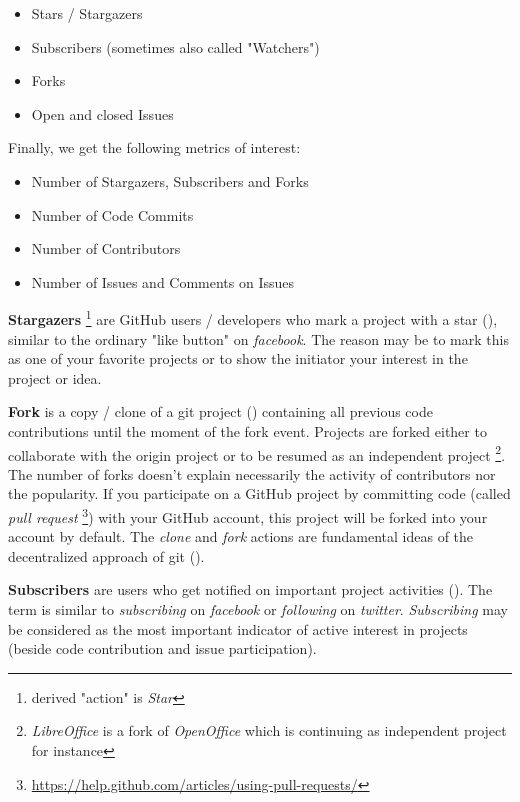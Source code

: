 \begin{itemize}
	\item Stars / Stargazers
	\item Subscribers (sometimes also called "Watchers")
	\item Forks
	\item Open and closed Issues
\end{itemize}

Finally, we get the following metrics of interest:

\begin{itemize}
	\item Number of Stargazers, Subscribers and Forks
	\item Number of Code Commits
	\item Number of Contributors
	\item Number of Issues and Comments on Issues
\end{itemize}

\textbf{Stargazers} \footnote{derived "action" is \textit{Star}} are GitHub users / developers who mark a project with a star (\cite{GitHubStargazers}), similar to the ordinary "like button" on \textit{facebook}. The reason may be to mark this as one of your favorite projects or to show the initiator your interest in the project or idea.

\textbf{Fork} is a copy / clone of a git project (\cite{GitHubForks}) containing all previous code contributions until the moment of the fork event. Projects are forked either to collaborate with the origin project or to be resumed as an independent project \footnote{\textit{LibreOffice} is a fork of \textit{OpenOffice} which is continuing as independent project for instance}. The number of forks doesn't explain necessarily the activity of contributors nor the popularity. If you participate on a GitHub project by committing code (called \textit{pull request} \footnote{\url{https://help.github.com/articles/using-pull-requests/}}) with your GitHub account, this project will be forked into your account by default. The \textit{clone} and \textit{fork} actions are fundamental ideas of the decentralized approach of git (\cite{loeliger2006collaborating}).

\textbf{Subscribers} are users who get notified on important project activities (\cite{GitHubWatchers}). The term is similar to \textit{subscribing} on \textit{facebook} or \textit{following} on \textit{twitter}. \textit{Subscribing} may be considered as the most important indicator of active interest in projects (beside code contribution and issue participation).

